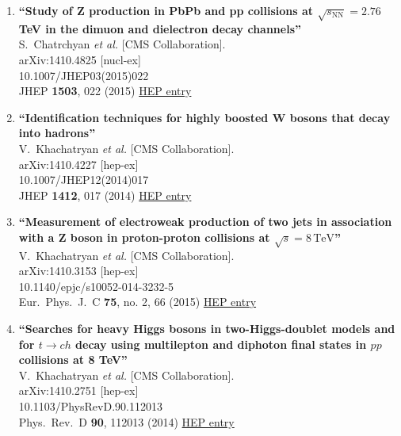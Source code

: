 \documentclass{article}
\begin{document}
\begin{enumerate}
\item%
{\bf ``Study of Z production in PbPb and pp collisions at $ \sqrt{s_{\mathrm{NN}}}=2.76 $ TeV in the dimuon and dielectron decay channels''}
  \\{}S.~Chatrchyan {\it et al.} [CMS Collaboration].
  \\{}arXiv:1410.4825 [nucl-ex]
    \\{}10.1007/JHEP03(2015)022
\\{}JHEP {\bf 1503}, 022 (2015) %
\href{http://inspirehep.net/record/1322726}{HEP entry}


\item%
{\bf ``Identification techniques for highly boosted W bosons that decay into hadrons''}
  \\{}V.~Khachatryan {\it et al.} [CMS Collaboration].
  \\{}arXiv:1410.4227 [hep-ex]
    \\{}10.1007/JHEP12(2014)017
\\{}JHEP {\bf 1412}, 017 (2014) %
\href{http://inspirehep.net/record/1322563}{HEP entry}


\item%
{\bf ``Measurement of electroweak production of two jets in association with a Z boson in proton-proton collisions at $\sqrt{s}=8\,\text {TeV}$''}
  \\{}V.~Khachatryan {\it et al.} [CMS Collaboration].
  \\{}arXiv:1410.3153 [hep-ex]
    \\{}10.1140/epjc/s10052-014-3232-5
\\{}Eur.\ Phys.\ J.\ C {\bf 75}, no. 2, 66 (2015) %
\href{http://inspirehep.net/record/1321687}{HEP entry}


\item%
{\bf ``Searches for heavy Higgs bosons in two-Higgs-doublet models and for $t→ch$ decay using multilepton and diphoton final states in $pp$ collisions at 8 TeV''}
  \\{}V.~Khachatryan {\it et al.} [CMS Collaboration].
  \\{}arXiv:1410.2751 [hep-ex]
    \\{}10.1103/PhysRevD.90.112013
\\{}Phys.\ Rev.\ D {\bf 90}, 112013 (2014) %
\href{http://inspirehep.net/record/1321537}{HEP entry}



\end{enumerate}
\end{document}

